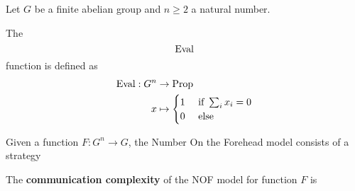 
Let $G$ be a finite abelian group and $n \ge 2$ a natural number.

\begin{definition}
  \label{def:eval}
  \uses{}

  The $$\operatorname{Eval}$$ function is defined as
  \begin{align}
      \operatorname{Eval} : G^n & \to \operatorname{Prop} \\
      x & \mapsto \begin{cases}
      1 & \text{ if } \sum_i x_i = 0 \\
      0 & \text{ else}
    \end{cases}
  \end{align}
\end{definition}

\begin{definition}
  \label{def:nof-model}
  \uses{}

  Given a function $F : G^n \to G$, the Number On the Forehead model consists of a strategy
\end{definition}

\begin{definition}
  \label{def:nof-complexity}

  The {\bf communication complexity} of the NOF model for function $F$ is
\end{definition}

\begin{theorem}
  \label{thm:randomised-complexity-nof-eval}
  \lean{}


\end{theorem}

